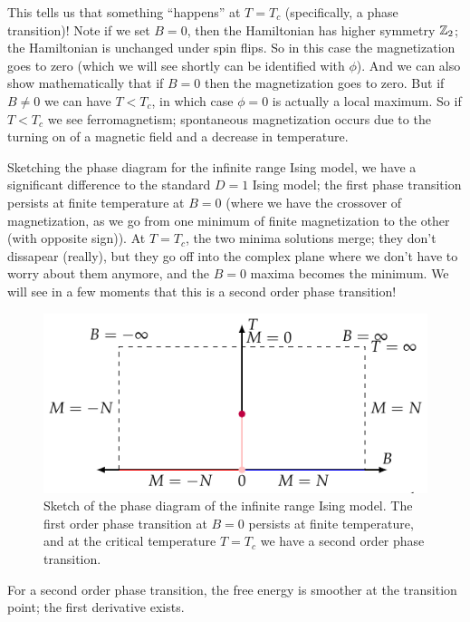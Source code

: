 This tells us that something ``happens'' at $T = T_c$ (specifically, a phase transition)! Note if we set $B = 0$, then the Hamiltonian has higher symmetry $\mathbb{Z}_2$; the Hamiltonian is unchanged under spin flips. So in this case the magnetization goes to zero (which we will see shortly can be identified with $\phi$). And we can also show mathematically that if $B = 0$ then the magnetization goes to zero. But if $B \neq 0$ we can have $T < T_c$, in which case $\phi = 0$ is actually a local maximum. So if $T < T_c$ we see ferromagnetism; spontaneous magnetization occurs due to the turning on of a magnetic field and a decrease in temperature.

Sketching the phase diagram for the infinite range Ising model, we have a significant difference to the standard $D = 1$ Ising model; the first phase transition persists at finite temperature at $B = 0$ (where we have the crossover of magnetization, as we go from one minimum of finite magnetization to the other (with opposite sign)). At $T = T_c$, the two minima solutions merge; they don't dissapear (really), but they go off into the complex plane where we don't have to worry about them anymore, and the $B = 0$ maxima becomes the minimum. We will see in a few moments that this is a second order phase transition!

\begin{figure}[htbp]
    \centering
    \includegraphics{Images/fig-IsingphasediagramB0.pdf}
    
    \caption{Sketch of the phase diagram of the infinite range Ising model. The first order phase transition at $B = 0$ persists at finite temperature, and at the critical temperature $T = T_c$ we have a second order phase transition.}
    \label{fig-infIsingphasediagram}
\end{figure}

For a second order phase transition, the free energy is smoother at the transition point; the first derivative exists.

